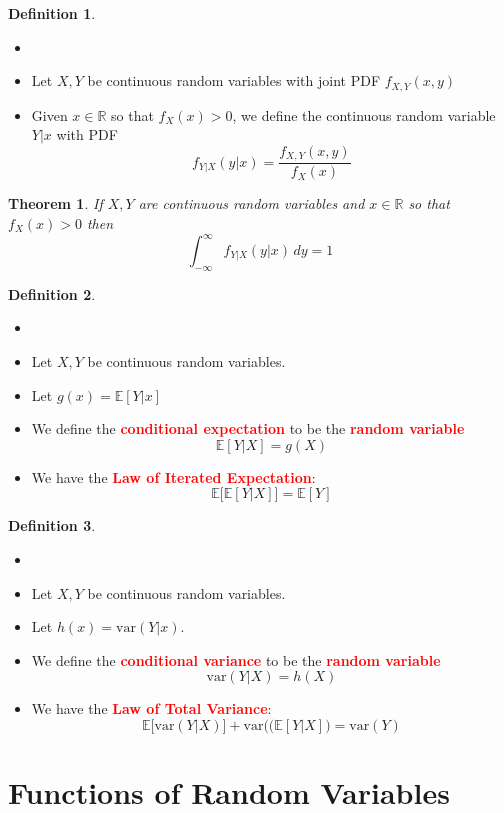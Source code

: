 \documentclass{article}
\newcommand{\R}{\mathbb{R}}
\newcommand{\E}{\mathbb{E}}
\newcommand{\var}{\text{var}}
\newcommand{\bfred}[1]{\textcolor{red}{\textbf{#1}}}
\theoremstyle{plain}
\newtheorem{thm}{Theorem}[section]
\theoremstyle{definition}
\newtheorem{defn}{Definition}[section]
\theoremstyle{remark}
\begin{document}
\begin{defn}
    \begin{itemize}
        \item []
        \item Let $X,Y$ be continuous random variables with joint PDF $f_{X,Y}(x,y)$
        \item Given $x\in\R$ so that $f_X(x)>0$, we define the continuous random variable $Y|x$ with PDF \[f_{Y|X}(y|x)=\frac{f_{X,Y}(x,y)}{f_X(x)}\]
    \end{itemize}
\end{defn}

\begin{thm}
    If $X,Y$ are continuous random variables and $x\in\R$ so that $f_X(x)>0$ then \[\int_{-\infty}^{\infty}f_{Y|X}(y|x)\,dy=1\]
\end{thm}

\begin{defn}
    \begin{itemize}
        \item []
        \item Let $X,Y$ be continuous random variables.
        \item Let $g(x) = \E[Y|x]$
        \item We define the \bfred{conditional expectation} to be the \bfred{random variable} \[\E[Y|X]=g(X)\] 
        \item We have the \bfred{Law of Iterated Expectation}: \[\E\bigr[\E[Y|X]\bigr]=\E[Y]\]
    \end{itemize}
\end{defn}

\begin{defn}
    \begin{itemize}
        \item []
        \item Let $X,Y$ be continuous random variables.
        \item Let $h(x)=\var(Y|x)$.
        \item We define the \bfred{conditional variance} to be the \bfred{random variable} \[\var(Y|X)=h(X)\]
        \item We have the \bfred{Law of Total Variance}: \[\E\bigr[\var(Y|X)\bigr]+\var(\bigr(\E[Y|X]\bigr)=\var(Y)\]
    \end{itemize}
\end{defn}

\section{Functions of Random Variables}
\end{document}

